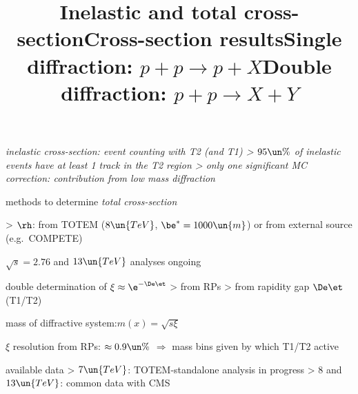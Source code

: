 \newpage %
\title{Inelastic and total cross-section}

\> \em{inelastic cross-section}: event counting with T2 (and T1)
\>> $95\un{\%}$ of inelastic events have at least 1 track in the T2 region
\>> only one significant MC correction: contribution from low mass diffraction

 methods to determine \em{total cross-section}

\centerline{}

\>> $\rh$: from TOTEM ($8\un{TeV}$, $\be^* = 1000\un{m}$) or from external source (e.g.~COMPETE)


\newpage %
\title{Cross-section results}

\centerline{%
	\hskip2mm
}

\> $\sqrt s = 2.76$ and $13\un{TeV}$ analyses ongoing


\newpage %
\title{Single diffraction: $p + p \rightarrow p + X$}

\centerline{}

\> double determination of $\xi \approx \e^{-\De\et}$
\>> from RPs
\>> from rapidity gap $\De\et$ (T1/T2)

\> mass of diffractive system:\cBlack $m(x) = \sqrt{s \xi}$ 

\> $\xi$ resolution from RPs: $\approx 0.9\un{\%}$ $\Rightarrow$ mass bins given by which T1/T2 active

\> available data
\>> $7\un{TeV}$: TOTEM-standalone analysis in progress
\>> $8$ and $13\un{TeV}$: common data with CMS

\newpage %

\centerline{}

\newpage %
\title{Double diffraction: $p + p \rightarrow X + Y$}

\centerline{}

